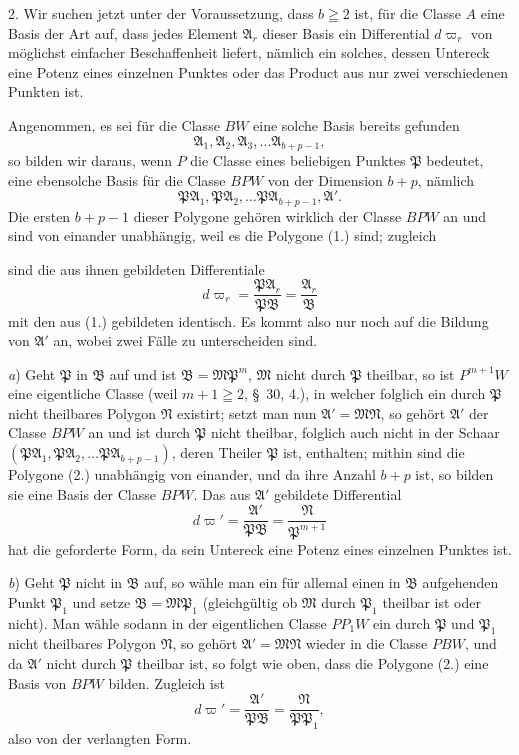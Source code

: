 \documentclass{article}
\begin{document}
2. Wir suchen jetzt unter der Voraussetzung, dass $b \geqq 2$ ist, für die Classe $A$ eine Basis der Art auf, dass jedes Element $\mathfrak{A}_{r}$ dieser Basis ein Differential $d\varpi_{r}$ von möglichst einfacher Beschaffenheit liefert, nämlich ein solches, dessen Untereck eine Potenz eines einzelnen Punktes oder das Product aus nur zwei verschiedenen Punkten ist.

Angenommen, es sei für die Classe $BW$ eine solche Basis bereits gefunden
\[ \mathfrak{A}_{1}, \mathfrak{A}_{2}, \mathfrak{A}_{3}, \ldots \mathfrak{A}_{b+p-1}, \tag{1.} \]
so bilden wir daraus, wenn $P$ die Classe eines beliebigen Punktes $\mathfrak{P}$ bedeutet, eine ebensolche Basis für die Classe $BPW$ von der Dimension $b+p$, nämlich
\[ \mathfrak{P}\mathfrak{A}_{1}, \mathfrak{P}\mathfrak{A}_{2}, \ldots \mathfrak{P}\mathfrak{A}_{b+p-1}, \mathfrak{A}'. \tag{2.} \]
Die ersten $b+p-1$ dieser Polygone gehören wirklich der Classe $BPW$ an und sind von einander unabhängig, weil es die Polygone (1.) sind; zugleich

sind die aus ihnen gebildeten Differentiale
\[ d\varpi_{r} = \frac{\mathfrak{P}\mathfrak{A}_{r}}{\mathfrak{P}\mathfrak{B}} = \frac{\mathfrak{A}_{r}}{\mathfrak{B}} \]
mit den aus (1.) gebildeten identisch. Es kommt also nur noch auf die Bildung von $\mathfrak{A}'$ an, wobei zwei Fälle zu unterscheiden sind.

\emph{a}) Geht $\mathfrak{P}$ in $\mathfrak{B}$ auf und ist $\mathfrak{B} = \mathfrak{M}\mathfrak{P}^{m}$, $\mathfrak{M}$ nicht durch $\mathfrak{P}$ theilbar, so ist $P^{m+1}W$ eine eigentliche Classe (weil $m+1 \geqq 2$, §~30, 4.), in welcher folglich ein durch $\mathfrak{P}$ nicht theilbares Polygon $\mathfrak{N}$ existirt; setzt man nun $\mathfrak{A}' = \mathfrak{M}\mathfrak{N}$, so gehört $\mathfrak{A}'$ der Classe $BPW$ an und ist durch $\mathfrak{P}$ nicht theilbar, folglich auch nicht in der Schaar $(\mathfrak{P}\mathfrak{A}_{1}, \mathfrak{P}\mathfrak{A}_{2}, \ldots \mathfrak{P}\mathfrak{A}_{b+p-1})$, deren Theiler $\mathfrak{P}$ ist, enthalten; mithin sind die Polygone (2.) unabhängig von einander, und da ihre Anzahl $b+p$ ist, so bilden sie eine Basis der Classe $BPW$. Das aus $\mathfrak{A}'$ gebildete Differential
\[ d\varpi' = \frac{\mathfrak{A}'}{\mathfrak{P}\mathfrak{B}} = \frac{\mathfrak{N}}{\mathfrak{P}^{m+1}} \]
hat die geforderte Form, da sein Untereck eine Potenz eines einzelnen Punktes ist.

\emph{b}) Geht $\mathfrak{P}$ nicht in $\mathfrak{B}$ auf, so wähle man ein für allemal einen in $\mathfrak{B}$ aufgehenden Punkt $\mathfrak{P}_{1}$ und setze $\mathfrak{B} = \mathfrak{M}\mathfrak{P}_{1}$ (gleichgültig ob $\mathfrak{M}$ durch $\mathfrak{P}_{1}$ theilbar ist oder nicht). Man wähle sodann in der eigentlichen Classe $PP_{1}W$ ein durch $\mathfrak{P}$ und $\mathfrak{P}_{1}$ nicht theilbares Polygon $\mathfrak{N}$, so gehört $\mathfrak{A}' = \mathfrak{M}\mathfrak{N}$ wieder in die Classe $PBW$, und da $\mathfrak{A}'$ nicht durch $\mathfrak{P}$ theilbar ist, so folgt wie oben, dass die Polygone (2.) eine Basis von $BPW$ bilden. Zugleich ist
\[ d\varpi' = \frac{\mathfrak{A}'}{\mathfrak{P}\mathfrak{B}} = \frac{\mathfrak{N}}{\mathfrak{P}\mathfrak{P}_{1}}, \]
also von der verlangten Form.
\end{document}
